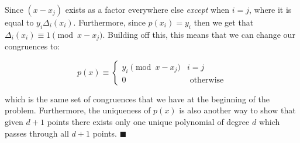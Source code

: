 \documentclass[11pt]{article}
\begin{document}
\begin{Parts}
\begin{solution}
    Since $(x - x_j)$ exists as a factor everywhere else \textit{except} when $i = j$, where it is equal to $y_i\Delta_i(x_i)$. Furthermore, since $p(x_i) = y_i$ then we get that $\Delta_i(x_i) \equiv 1 \pmod{x - x_j}$. Building off this, this means that we can change our congruences to: 
    
    \[ 
        p(x) \equiv \begin{cases}
            y_i \pmod{x - x_j} & i = j \\
            0 &\text{ otherwise}
        \end{cases}
    \] 

    which is the same set of congruences that we have at the beginning of the problem. Furthermore, the uniqueness of $p(x)$ is also another way to show that given $d + 1$ points there exists only one unique polynomial of degree $d$ which passes through all $d+1$ points. $\blacksquare$



\end{solution}

\end{Parts}
\end{document}
